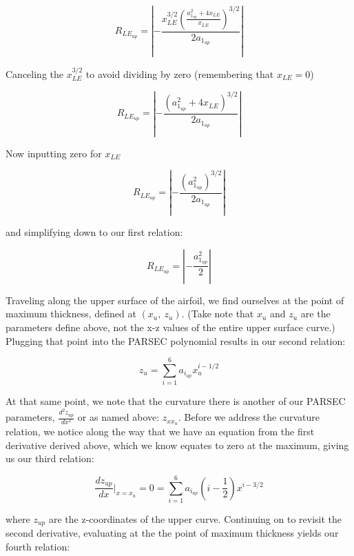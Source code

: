 \begin{equation} R_{LE_{up}}= \left| -\frac{x_{LE}^{3/2} \left(\frac{a_{1_{up}}^2 + 4 x_{LE}}{x_{LE}}\right)^{3/2}}{2 a_{1_{up}}} \right|  \end{equation}

Canceling the $x_{LE}^{3/2}$ to avoid dividing by zero (remembering that $x_{LE} = 0$)

\begin{equation}  R_{LE_{up}}= \left| -\frac{\left(a_{1_{up}}^2 + 4 x_{LE}\right)^{3/2}}{2 a_{1_{up}}} \right|  \end{equation}

Now inputting zero for $x_{LE}$

\begin{equation} R_{LE_{up}}= \left| -\frac{\left(a_{1_{up}}^2\right)^{3/2}}{2 a_{1_{up}}} \right|  \end{equation}

and simplifying down to our first relation:

\begin{equation} R_{LE_{up}}= \left| -\frac{a_{1_{up}}^2}{2} \right|  \end{equation}

Traveling along the upper surface of the airfoil, we find ourselves at the point of maximum thickness, defined at $(x_u,~z_u)$. (Take note that $x_u$ and $z_u$ are the parameters define above, not the x-z values of the entire upper surface curve.) Plugging that point into the PARSEC polynomial results in our second relation:

\begin{equation} z_u = \sum_{i=1}^6 a_{i_{up}} x_u^{i-1/2} \end{equation}

At that same point, we note that the curvature there is another of our PARSEC parameters, $\frac{d^2z_{up}}{dx^2}$ or as named above: $z_{xx_u}$. Before we address the curvature relation, we notice along the way that we have an equation from the first derivative derived above, which we know equates to zero at the maximum, giving us our third relation:

\begin{equation} \frac{dz_{up}}{dx} \biggr\rvert_{x=x_u} = 0 = \sum_{i=1}^6 a_{i_{up}} \left(i-\frac{1}{2}\right) x^{i-3/2}  \end{equation}

where $z_{up}$ are the z-coordinates of the upper curve. Continuing on to revisit the second derivative, evaluating at the the point of maximum thickness yields our fourth relation:

